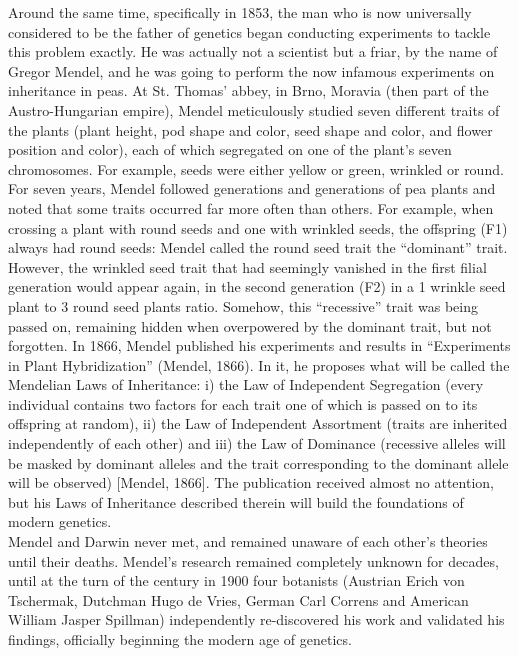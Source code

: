 Around the same time, specifically in 1853, the man who is now universally considered to be the father of genetics began conducting experiments to tackle this problem exactly. 
He was actually not a scientist but a friar, by the name of Gregor Mendel, and he was going to perform the now infamous experiments on inheritance in peas. 
At St. Thomas’ abbey, in Brno, Moravia (then part of the Austro-Hungarian empire), Mendel meticulously studied seven different traits of the plants (plant height, pod shape and color, seed shape and color, and flower position and color), each of which segregated on one of the plant's seven chromosomes. 
For example, seeds were either yellow or green, wrinkled or round. For seven years, Mendel followed generations and generations of pea plants and noted that some traits occurred far more often than others. 
For example, when crossing a plant with round seeds and one with wrinkled seeds, the offspring (F1) always had round seeds: Mendel called the round seed trait the “dominant” trait. However, the wrinkled seed trait that had seemingly vanished in the first filial generation would appear again, in the second generation (F2) in a 1 wrinkle seed plant to 3 round seed plants ratio. Somehow, this “recessive” trait was being passed on, remaining hidden when overpowered by the dominant trait, but not forgotten. 
In 1866, Mendel published his experiments and results in “Experiments in Plant Hybridization” (Mendel, 1866). 
In it, he proposes what will be called the Mendelian Laws of Inheritance: i) the Law of Independent Segregation (every individual contains two factors for each trait one of which is passed on to its offspring at random), ii) the Law of Independent Assortment (traits are inherited independently of each other) and iii) the Law of Dominance (recessive alleles will be masked by dominant alleles and the trait corresponding to the dominant allele will be observed) [Mendel, 1866]. 
The publication received almost no attention, but his Laws of Inheritance described therein will build the foundations of modern genetics.\\

Mendel and Darwin never met, and remained unaware of each other’s theories until their deaths. Mendel’s research remained completely unknown for decades, until at the turn of the century in 1900 four botanists (Austrian Erich von Tschermak, Dutchman Hugo de Vries, German Carl Correns and American William Jasper Spillman) independently re-discovered his work and validated his findings, officially beginning the modern age of genetics.\\ 

